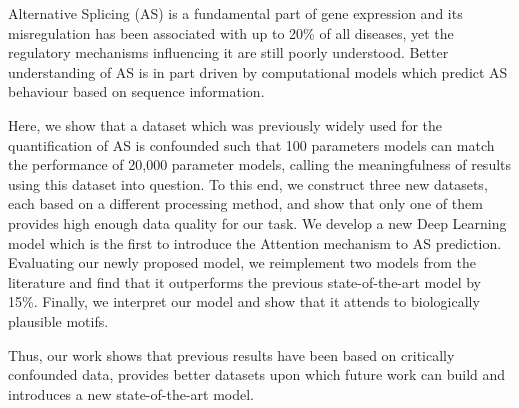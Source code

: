
Alternative Splicing (AS) is a fundamental part of gene expression and its misregulation has been associated with up to 20\% of all diseases, yet the regulatory mechanisms influencing it are still poorly understood. Better understanding of AS is in part driven by computational models which predict AS behaviour based on sequence information. 

Here, we show that a dataset which was previously widely used for the quantification of AS is confounded such that 100 parameters models can match the performance of 20,000 parameter models, calling the meaningfulness of results using this dataset into question. To this end, we construct three new datasets, each based on a different processing method, and show that only one of them provides high enough data quality for our task. We develop a new Deep Learning model which is the first to introduce the Attention mechanism to AS prediction. Evaluating our newly proposed model, we reimplement two models from the literature and find that it outperforms the previous state-of-the-art model by 15\%. Finally, we interpret our model and show that it attends to biologically plausible motifs. 

Thus, our work shows that previous results have been based on critically confounded data,
provides better datasets upon which future work can build and introduces a new state-of-the-art model. 

